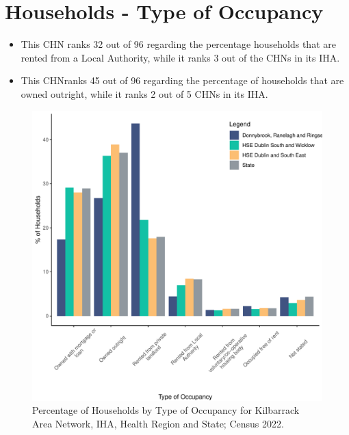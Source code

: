 \documentclass{article}
\begin{document}
\section{Households - Type of Occupancy}\label{sect:Households}
\begin{itemize}
\item This CHN ranks  32 out of 96 regarding the percentage households that are rented from a Local Authority, while it ranks  3 out of the CHNs in its IHA. 
\item This CHNranks  45 out of 96 regarding the percentage of households that are owned outright, while it ranks   2 out of 5 CHNs in its IHA.
\end{itemize}
\begin{figure}[H]
	\centering
	\includegraphics[width = 140mm]{../figures/HouseholdsED.pdf}
	\caption{Percentage of Households by Type of Occupancy for Kilbarrack Area Network, IHA, Health Region and State; Census 2022.}
	\label{fig:vbnv}
	\end{figure}
\end{document}
